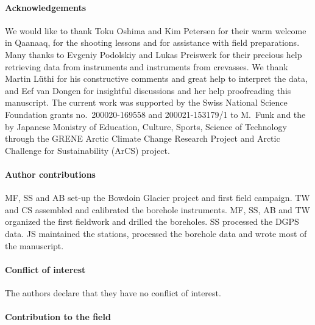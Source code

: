 \documentclass[utf8]{article}
\begin{document}

\paragraph{Acknowledgements}

    We would like to thank Toku Oshima and Kim Petersen for their warm welcome
    in Qaanaaq, for the shooting lessons and for assistance with field
    preparations. Many thanks to Evgeniy Podolskiy and Lukas Preiswerk for
    their precious help retrieving data from instruments and instruments from
    crevasses. We thank Martin Lüthi for his constructive comments and great
    help to interpret the data, and Eef van Dongen for insightful discussions
    and her help proofreading this manuscript.
    The current work was supported by the Swiss National Science Foundation
    grants no.~200020-169558 and 200021-153179/1 to M.~Funk and the by Japanese
    Monistry of Education, Culture, Sports, Science of Technology through
    the GRENE Arctic Climate Change Research Project and Arctic Challenge for
    Sustainability (ArCS) project.

\paragraph{Author contributions}

    MF, SS and AB set-up the Bowdoin Glacier project and first field campaign.
    TW and CS assembled and calibrated the borehole instruments. MF, SS, AB and
    TW organized the first fieldwork and drilled the boreholes. SS processed
    the DGPS data. JS maintained the stations, processed the borehole data and
    wrote most of the manuscript.

\paragraph{Conflict of interest}

    The authors declare that they have no conflict of interest.

\paragraph{Contribution to the field}
\end{document}
